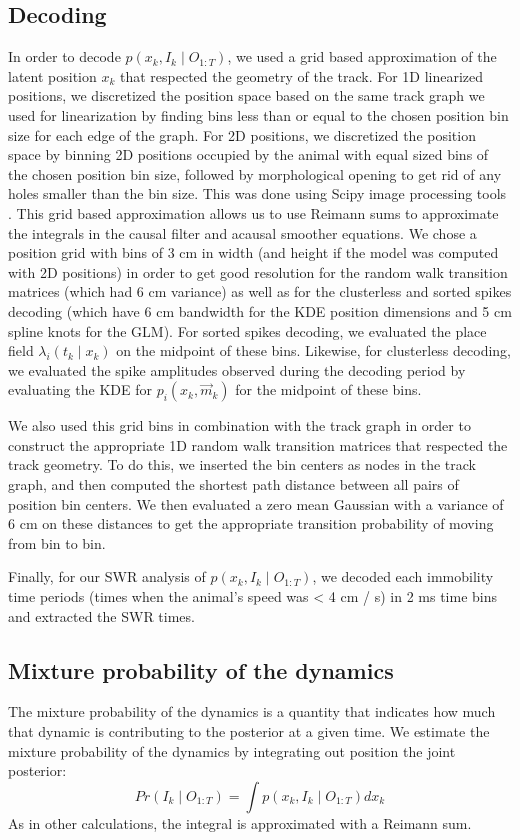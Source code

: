 \documentclass[times, twoside]{zHenriquesLab-StyleBioRxiv}
\begin{document}
\subsection*{Decoding}
In order to decode $p(x_{k}, I_{k} \mid O_{1:T})$, we used a grid based approximation of the latent position $x_k$ that respected the geometry of the track. For 1D linearized positions, we discretized the position space based on the same track graph we used for linearization by finding bins less than or equal to the chosen position bin size for each edge of the graph. For 2D positions, we discretized the position space by binning 2D positions occupied by the animal with equal sized bins of the chosen position bin size, followed by morphological opening to get rid of any holes smaller than the bin size. This was done using Scipy image processing tools \cite{SciPy1.0ContributorsSciPyfundamentalalgorithms2020}. This grid based approximation allows us to use Reimann sums to approximate the integrals in the causal filter and acausal smoother equations. We chose a position grid with bins of 3 cm in width (and height if the model was computed with 2D positions) in order to get good resolution for the random walk transition matrices (which had 6 cm variance) as well as for the clusterless and sorted spikes decoding (which have 6 cm bandwidth for the KDE position dimensions and 5 cm spline knots for the GLM). For sorted spikes decoding, we evaluated the place field $\lambda_{i}(t_{k} \mid x_{k})$ on the midpoint of these bins. Likewise, for clusterless decoding, we evaluated the spike amplitudes observed during the decoding period by evaluating the KDE for $p_{i}(x_k, \vec{m}_k)$ for the midpoint of these bins.

We also used this grid bins in combination with the track graph in order to construct the appropriate 1D random walk transition matrices that respected the track geometry. To do this, we inserted the bin centers as nodes in the track graph, and then computed the shortest path distance between all pairs of position bin centers. We then evaluated a zero mean Gaussian with a variance of 6 cm on these distances to get the appropriate transition probability of moving from bin to bin.

Finally, for our SWR analysis of $p(x_{k}, I_{k} \mid O_{1:T})$, we decoded each immobility time periods (times when the animal's speed was < 4 cm / s) in 2 ms time bins and extracted the SWR times.

\subsection*{Mixture probability of the dynamics}
The mixture probability of the dynamics is a quantity that indicates how much that dynamic is contributing to the posterior at a given time. We estimate the mixture probability of the dynamics by integrating out position the joint posterior:
$$Pr(I_{k} \mid O_{1:T}) = \int p(x_{k}, I_{k} \mid O_{1:T}) dx_{k}$$
As in other calculations, the integral is approximated with a Reimann sum.
\end{document}
